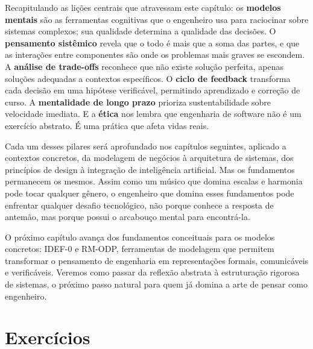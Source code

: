 Recapitulando as lições centrais que atravessam este capítulo: os
\textbf{modelos mentais} são as ferramentas cognitivas que o engenheiro
usa para raciocinar sobre sistemas complexos; sua qualidade determina a
qualidade das decisões. O \textbf{pensamento sistêmico} revela que o
todo é mais que a soma das partes, e que as interações entre componentes
são onde os problemas mais graves se escondem. A \textbf{análise de
trade-offs} reconhece que não existe solução perfeita, apenas soluções
adequadas a contextos específicos. O \textbf{ciclo de feedback}
transforma cada decisão em uma hipótese verificável, permitindo
aprendizado e correção de curso. A \textbf{mentalidade de longo prazo}
prioriza sustentabilidade sobre velocidade imediata. E a \textbf{ética}
nos lembra que engenharia de software não é um exercício abstrato. É
uma prática que afeta vidas reais.

Cada um desses pilares será aprofundado nos capítulos seguintes, aplicado
a contextos concretos, da modelagem de negócios à arquitetura de
sistemas, dos princípios de design à integração de inteligência
artificial. Mas os fundamentos permanecem os mesmos. Assim como um
músico que domina escalas e harmonia pode tocar qualquer gênero, o
engenheiro que domina esses fundamentos pode enfrentar qualquer desafio
tecnológico, não porque conhece a resposta de antemão, mas porque
possui o arcabouço mental para encontrá-la.

O próximo capítulo avança dos fundamentos conceituais para os modelos
concretos: IDEF-0 e RM-ODP, ferramentas de modelagem que permitem
transformar o pensamento de engenharia em representações formais,
comunicáveis e verificáveis. Veremos como passar da reflexão abstrata
à estruturação rigorosa de sistemas, o próximo passo natural para
quem já domina a arte de pensar como engenheiro.

\section*{Exercícios}

